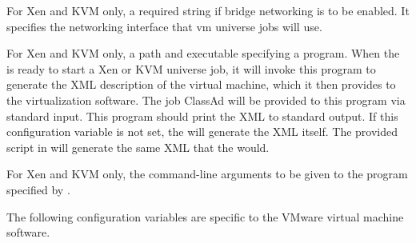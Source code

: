 \begin{description}
\label{param:VMNetworkingBridgeInterface}
\item[\Macro{VM\_NETWORKING\_BRIDGE\_INTERFACE}]
  For Xen and KVM only, a required string if bridge networking is to be
  enabled.  It specifies the networking interface that vm universe jobs
  will use.

\label{param:LibvirtXmlScript}
\item[\Macro{LIBVIRT\_XML\_SCRIPT}]
  For Xen and KVM only, a path and executable specifying a program.
  When the  is ready to start a Xen or KVM 
   universe job, 
  it will invoke this program to generate the XML description of 
  the virtual machine,
  which it then provides to the virtualization software.
  The job ClassAd will be provided to this program via standard input. 
  This program should print the XML to standard output.
  If this configuration variable is not set,
  the  will generate the XML itself. 
  The provided script in  
  will generate the same XML that the  would.

\label{param:LibvirtXmlScriptArgs}
\item[\Macro{LIBVIRT\_XML\_SCRIPT\_ARGS}]
  For Xen and KVM only, the command-line arguments to be given to 
  the program specified by  . 

\end{description}

The following configuration variables are specific to the VMware
virtual machine software.

